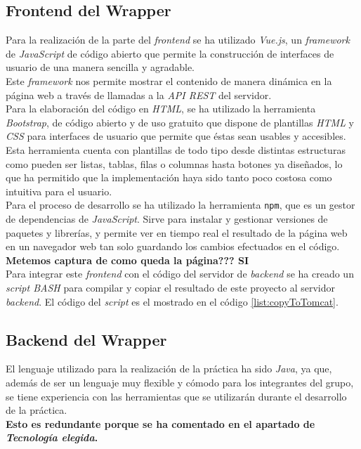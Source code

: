 \documentclass[10pt,a4paper]{article}
\begin{document}
\subsection{Frontend del Wrapper}

Para la realización de la parte del \emph{frontend} se ha utilizado \emph{Vue.js}, un \emph{framework} de \emph{JavaScript} de código abierto que permite la construcción de interfaces de usuario de una manera sencilla y agradable. \\ 
Este \emph{framework} nos permite mostrar el contenido de manera dinámica en la página web a través de llamadas a la \emph{API REST} del servidor.\\
Para la elaboración del código en \emph{HTML}, se ha utilizado la herramienta \emph{Bootstrap}, de código abierto y de uso gratuito que dispone de plantillas \emph{HTML} y \emph{CSS} para interfaces de usuario que permite que éstas sean usables y accesibles. Esta herramienta cuenta con plantillas de todo tipo desde distintas estructuras como pueden ser listas, tablas, filas o columnas hasta botones ya diseñados, lo que ha permitido que la implementación haya sido tanto poco costosa como intuitiva para el usuario.\\
Para el proceso de desarrollo se ha utilizado la herramienta \texttt{npm}, que es un gestor de dependencias de \emph{JavaScript}. Sirve para instalar y gestionar versiones de paquetes y librerías, y permite ver en tiempo real el resultado de la página web en un navegador web tan solo guardando los cambios efectuados en el código.\\

\textbf{Metemos captura de como queda la página??? {\Huge SI}}\\

Para integrar este \emph{frontend} con el código del servidor de \emph{backend} se ha creado un \emph{script BASH} para compilar y copiar el resultado de este proyecto al servidor \emph{backend}. El código del \emph{script} es el mostrado en el código \ref{list:copyToTomcat}.



\subsection{Backend del Wrapper}
El lenguaje utilizado para la realización de la práctica ha sido \textit{Java}, ya que, además de ser un lenguaje muy flexible y cómodo para los integrantes del grupo, se tiene experiencia con las herramientas que se utilizarán durante el desarrollo de la práctica.\\
{\Huge \textbf{Esto es redundante porque se ha comentado en el apartado de \emph{Tecnología elegida}.}}\\
\end{document}

